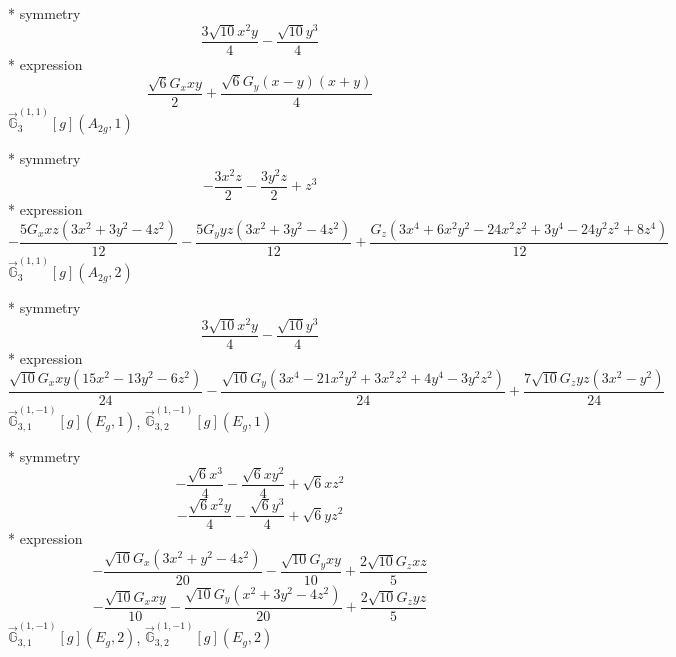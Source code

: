 \documentclass[fleqn,8pt]{jsarticle}
\begin{document}
\noindent\quad ** symmetry
\begin{dmath*}
\frac{3 \sqrt{10} x^{2} y}{4} - \frac{\sqrt{10} y^{3}}{4}
\end{dmath*}
\noindent\quad ** expression
\begin{dmath*}
\frac{\sqrt{6} G_{x} x y}{2} + \frac{\sqrt{6} G_{y} \left(x - y\right) \left(x + y\right)}{4}
\end{dmath*}
\noindent\quad $\vec{\mathbb{G}}_{3}^{(1,1)}[g](A_{2g},1)$

\noindent\quad ** symmetry
\begin{dmath*}
- \frac{3 x^{2} z}{2} - \frac{3 y^{2} z}{2} + z^{3}
\end{dmath*}
\noindent\quad ** expression
\begin{dmath*}
- \frac{5 G_{x} x z \left(3 x^{2} + 3 y^{2} - 4 z^{2}\right)}{12} - \frac{5 G_{y} y z \left(3 x^{2} + 3 y^{2} - 4 z^{2}\right)}{12} + \frac{G_{z} \left(3 x^{4} + 6 x^{2} y^{2} - 24 x^{2} z^{2} + 3 y^{4} - 24 y^{2} z^{2} + 8 z^{4}\right)}{12}
\end{dmath*}
\noindent\quad $\vec{\mathbb{G}}_{3}^{(1,1)}[g](A_{2g},2)$

\noindent\quad ** symmetry
\begin{dmath*}
\frac{3 \sqrt{10} x^{2} y}{4} - \frac{\sqrt{10} y^{3}}{4}
\end{dmath*}
\noindent\quad ** expression
\begin{dmath*}
\frac{\sqrt{10} G_{x} x y \left(15 x^{2} - 13 y^{2} - 6 z^{2}\right)}{24} - \frac{\sqrt{10} G_{y} \left(3 x^{4} - 21 x^{2} y^{2} + 3 x^{2} z^{2} + 4 y^{4} - 3 y^{2} z^{2}\right)}{24} + \frac{7 \sqrt{10} G_{z} y z \left(3 x^{2} - y^{2}\right)}{24}
\end{dmath*}
\noindent\quad $\vec{\mathbb{G}}_{3,1}^{(1,-1)}[g](E_{g},1)$, $\vec{\mathbb{G}}_{3,2}^{(1,-1)}[g](E_{g},1)$

\noindent\quad ** symmetry
\begin{dmath*}
- \frac{\sqrt{6} x^{3}}{4} - \frac{\sqrt{6} x y^{2}}{4} + \sqrt{6} x z^{2}
\end{dmath*}
\begin{dmath*}
- \frac{\sqrt{6} x^{2} y}{4} - \frac{\sqrt{6} y^{3}}{4} + \sqrt{6} y z^{2}
\end{dmath*}
\noindent\quad ** expression
\begin{dmath*}
- \frac{\sqrt{10} G_{x} \left(3 x^{2} + y^{2} - 4 z^{2}\right)}{20} - \frac{\sqrt{10} G_{y} x y}{10} + \frac{2 \sqrt{10} G_{z} x z}{5}
\end{dmath*}
\begin{dmath*}
- \frac{\sqrt{10} G_{x} x y}{10} - \frac{\sqrt{10} G_{y} \left(x^{2} + 3 y^{2} - 4 z^{2}\right)}{20} + \frac{2 \sqrt{10} G_{z} y z}{5}
\end{dmath*}
\noindent\quad $\vec{\mathbb{G}}_{3,1}^{(1,-1)}[g](E_{g},2)$, $\vec{\mathbb{G}}_{3,2}^{(1,-1)}[g](E_{g},2)$
\end{document}
